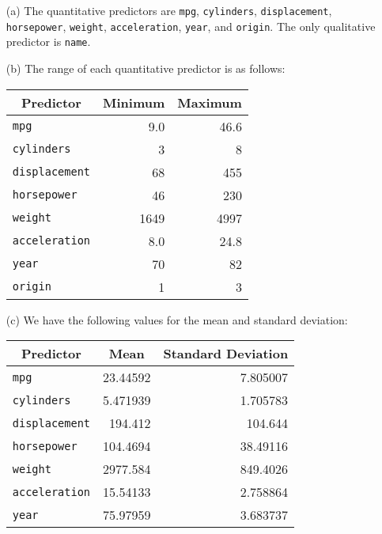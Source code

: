 
\begin{itemize}
    \item[(a)] The quantitative predictors are \verb|mpg|, \verb|cylinders|,
    \verb|displacement|, \verb|horsepower|, \verb|weight|, \verb|acceleration|,
    \verb|year|, and \verb|origin|. The only qualitative predictor is \verb|name|.
    \item[(b)] The range of each quantitative predictor is as follows:
    \begin{center}
        \begin{tabular}{ l | r | r }
            \multicolumn{1}{c}{Predictor} & \multicolumn{1}{c}{Minimum} 
            & \multicolumn{1}{c}{Maximum} \\
            \hline
            \verb|mpg| & 9.0 & 46.6 \\
            \verb|cylinders| & 3 & 8 \\
            \verb|displacement| & 68 & 455 \\
            \verb|horsepower| & 46 & 230 \\
            \verb|weight| & 1649 & 4997 \\
            \verb|acceleration| & 8.0 & 24.8 \\
            \verb|year| & 70 & 82 \\
            \verb|origin| & 1 & 3
        \end{tabular}
    \end{center}
    \item[(c)] We have the following values for the mean and standard deviation:
    \begin{center}
        \begin{tabular}{ l | r | r }
            \multicolumn{1}{c}{Predictor} & \multicolumn{1}{c}{Mean} 
            & \multicolumn{1}{c}{Standard Deviation} \\
            \hline
            \verb|mpg| & 23.44592 & 7.805007 \\
            \verb|cylinders| & 5.471939 & 1.705783 \\
            \verb|displacement| & 194.412 & 104.644 \\
            \verb|horsepower| & 104.4694 & 38.49116 \\
            \verb|weight| & 2977.584 & 849.4026 \\
            \verb|acceleration| & 15.54133 & 2.758864 \\
            \verb|year| & 75.97959 & 3.683737 \\

\end{tabular}
\end{center}
\end{itemize}
